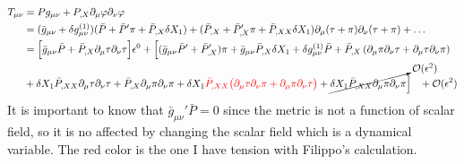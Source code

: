 \documentclass[a4paper,11pt]{article}
\begin{document}
\begin{align} \label{eqTmunuI}
T_{\mu \nu} &= P g_{\mu \nu} + P_{,X} \partial_{\mu} \varphi \partial_{\nu} \varphi
 \\
  \nonumber
   & =(\bar{g}_{\mu \nu} + \delta g^{(1)}_{\mu \nu}) (\bar{P}+\bar{P}' \pi+\bar{P}_{,X} \delta X_1) + (\bar{P}_{,X}+\bar{P}'_{,X} \pi+\bar{P}_{,XX} \delta X_1) \partial_{\mu} (\tau+ \pi) \partial_\nu (\tau+\pi)+ \ldots
\\ \nonumber & 
= \Big[ \bar{g}_{\mu \nu} \bar{P} 
+
 \bar{P}_{,X} \partial_{\mu} \tau \partial_{\nu} \tau \Big] \epsilon ^0 
+
\Big[( \bar{g}_{\mu \nu} \bar{P}'+ \bar{P}'_{,X} )\pi+\bar{g}_{\mu \nu}  \bar{P}_{,X} \delta X_1 
+
 \delta g^{(1)}_{\mu \nu} \bar{P} 
 +
  \bar{P}_{,X}  \left ( \partial_{\mu} \pi \partial_{\nu} \tau  
  +
  \partial_{\mu} \tau \partial_{\nu} \pi  \right ) 
    \nonumber \\ &
  +
   \delta X_1 \bar{P}_{,XX}   \partial_{\mu} \tau \partial_{\nu} \tau  
      +
    \bar{P}_{,X}   \partial_{\mu} \pi \partial_{\nu} \pi
    +  \delta X_1 {\color{red} \bar{P}_{,XX}  \big(  \partial_{\mu} \tau \partial_{\nu} \pi  +   \partial_{\mu} \pi \partial_{\nu} \tau  \big) }
    + \cancelto{\mathcal {O}(\epsilon^{2})}{\delta X_1 \bar{P}_{,XX}   \partial_{\mu} \pi \partial_{\nu} \pi  
   } \Big ] 
 \; \; \;+ \mathcal {O}(\epsilon^{2}) 
\end{align}
It is important to know that $\bar{g}_{\mu \nu}' \bar{P}=0$ since the metric is not a function of scalar field, so it is no affected by changing the scalar field which is a dynamical variable. 
{\color{red}The red color is the one I have tension with Filippo's calculation.}
\end{document}
